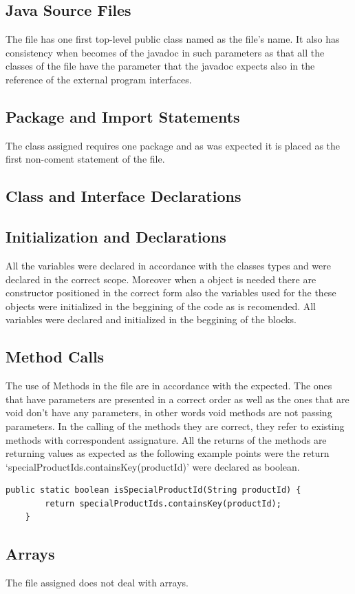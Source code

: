\documentclass[a4paper]{article}
\begin{document}
\subsection{Java Source Files}
The file has one first top-level public class named as the file's name. It also has consistency when becomes of the javadoc in such parameters as that all the classes of the file have the parameter that the javadoc expects also in the reference of the external program interfaces.
\subsection{Package and Import Statements}
The class assigned requires one package and as was expected  it is placed as the first non-coment statement of the file.
\subsection{Class and Interface Declarations}

\subsection{Initialization and Declarations}
All the variables were declared in accordance with the classes types and were declared in the correct scope. Moreover when a object is needed there are constructor positioned in the correct form also the variables used for the these objects were initialized in the beggining of the code as is recomended.
All variables were declared and initialized in the beggining of the blocks.
\subsection{Method Calls}
The use of Methods in the file are in accordance with the expected. The ones that have parameters are presented in a correct order as well as the ones that are void don't have any parameters,  in other words void methods are not passing parameters. 
In the calling of the methods they are correct, they refer to existing methods with correspondent assignature.
All the returns of the methods are returning values as expected as the following example points were the return `specialProductIds.containsKey(productId)' were declared as boolean.
\begin{verbatim}   
public static boolean isSpecialProductId(String productId) {
        return specialProductIds.containsKey(productId);
    }
\end{verbatim}   
\subsection{Arrays}
The file assigned does not deal with arrays.
\end{document}
